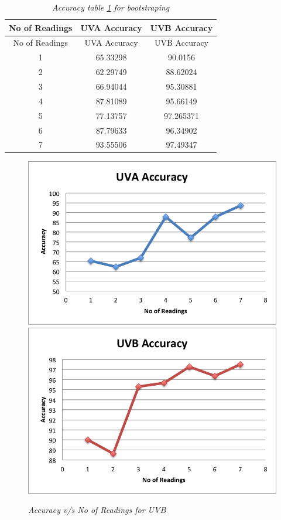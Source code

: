 \documentclass[12pt,fullpage,doublespace]{article}
\begin{document}
\newpage
\begin{table}
\centering
\begin{tabular}{|c|c|c|}
\hline
No of Readings & UVA Accuracy & UVB Accuracy \\
\hline
No of Readings & UVA Accuracy & UVB Accuracy \\
\hline 
1 & 65.33298 & 90.0156\\
\hline
2 & 62.29749 & 88.62024\\
\hline
3 & 66.94044 & 95.30881\\
\hline
4 & 87.81089 & 95.66149\\
\hline
5 & 77.13757 & 97.265371\\
\hline
6 & 87.79633 & 96.34902\\
\hline
7 & 93.55506 & 97.49347\\
\hline
\end{tabular}
\caption{\small \sl Accuracy table \ref{seg3accuracy} for bootstraping}\label{seg3accuracy}
\end{table}


\begin{figure}
\begin{center}
\includegraphics[scale=0.5]{segment3uva.png}
\includegraphics[scale=0.5]{segment3uvb.png}
\caption{\small \sl Accuracy v/s No of Readings for UVB}
\label{fig:lessReadings}
\end{center}
\end{figure}
\end{document}
